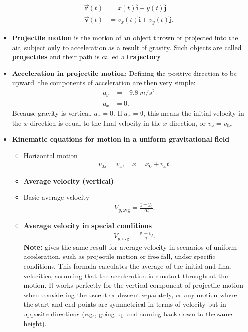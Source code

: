 \documentclass{report}
\begin{document}
\begin{itemize}
            \begin{align*}
                \vec{\mathbf{r}}(t) &= x(t)\hat{\mathbf{i}} + y(t)\hat{\mathbf{j}}\\
                \vec{\mathbf{v}}(t)&= v_{x}(t)\hat{\mathbf{i}} + v_{y}(t)\hat{\mathbf{j}}
            .\end{align*}
        \item \textbf{Projectile motion} is the motion of an object thrown or projected into the air, subject only to acceleration as a result of gravity. Such objects are called \textbf{projectiles} and their path is called a \textbf{trajectory}
        \item \textbf{Acceleration in projectile motion}: Defining the positive direction to be upward, the components of acceleration are then very simple:
            \begin{align*}
                a_{y} &= -9.8\ m/s^{2} \\
                a_{x} &= 0
            .\end{align*}
             Because gravity is vertical, $a_{x} = 0$. If  $a_{x} = 0$, this means the initial velocity in the $x$ direction is equal to the final velocity in the $x$ direction, or  $v_{x} = v_{0x} $
            \item \textbf{Kinematic equations for motion in a uniform gravitational field}
                \begin{itemize}
                    \item Horizontal motion 
                        \begin{align*}
                            v_{0x} = v_{x}, \quad x = x_{0} +v_{x}t
                        .\end{align*}
                    \item \textbf{Average velocity (vertical)}
                    \item Basic average velocity 
                        \begin{align*}
                            V_{y,\text{avg}} = \frac{y-y_{0}}{\Delta t}
                        .\end{align*}
                    \item \textbf{Average velocity in special conditions}
                        \begin{align*}
                            V_{y,\text{avg}} = \frac{v_i +v_f}{2}
                        .\end{align*}
                        \textbf{Note:} gives the same result for average velocity in scenarios of uniform acceleration, such as projectile motion or free fall, under specific conditions. This formula calculates the average of the initial and final velocities, assuming that the acceleration is constant throughout the motion. It works perfectly for the vertical component of projectile motion when considering the ascent or descent separately, or any motion where the start and end points are symmetrical in terms of velocity but in opposite directions (e.g., going up and coming back down to the same height).

\end{itemize}
\end{itemize}
\end{document}
